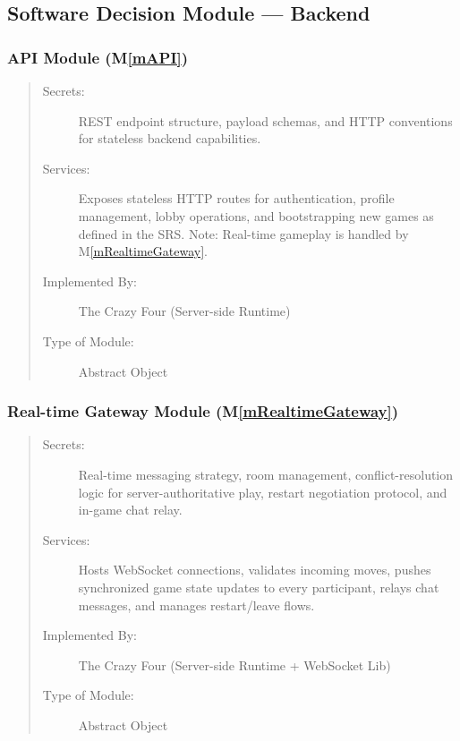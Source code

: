 \documentclass[12pt, titlepage]{article}
\newcommand{\mref}[1]{M\ref{#1}}
\begin{document}
\subsection{Software Decision Module --- Backend}

\subsubsection{API Module (\mref{mAPI})}
\begin{quote}
\begin{description}
  \item[Secrets:] REST endpoint structure, payload schemas, and HTTP conventions for stateless backend capabilities.
  \item[Services:] Exposes stateless HTTP routes for authentication, profile management, lobby operations, and bootstrapping new games as defined in the SRS. Note: Real-time gameplay is handled by \mref{mRealtimeGateway}.
  \item[Implemented By:] The Crazy Four (Server-side Runtime)
  \item[Type of Module:] Abstract Object
\end{description}
\end{quote}

\subsubsection{Real-time Gateway Module (\mref{mRealtimeGateway})}
\begin{quote}
\begin{description}
  \item[Secrets:] Real-time messaging strategy, room management, conflict-resolution logic for server-authoritative play, restart negotiation protocol, and in-game chat relay.
  \item[Services:] Hosts WebSocket connections, validates incoming moves, pushes synchronized game state updates to every participant, relays chat messages, and manages restart/leave flows.
  \item[Implemented By:] The Crazy Four (Server-side Runtime + WebSocket Lib)
  \item[Type of Module:] Abstract Object
\end{description}
\end{quote}
\end{document}
